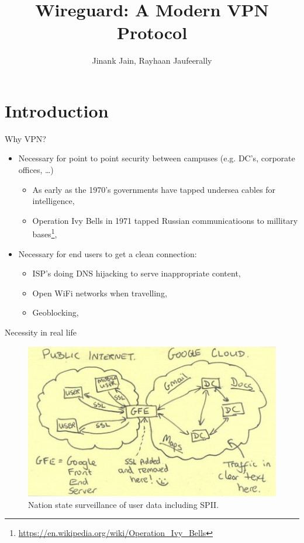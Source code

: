 \documentclass{beamer}
\title{Wireguard: A Modern VPN Protocol}
\author{Jinank Jain, Rayhaan Jaufeerally}
\institute{ETH Z\"urich}
\begin{document}
    \maketitle
    \section{Introduction}
    \begin{frame}{Why VPN?}
        \begin{itemize}
            \item Necessary for point to point security between campuses (e.g. DC's, corporate offices, \ldots)
                \begin{itemize}
                    \item As early as the 1970's governments have tapped undersea cables for intelligence,
                    \item Operation Ivy Bells in 1971 tapped Russian communicatioons to millitary bases\footnote{\url{https://en.wikipedia.org/wiki/Operation\_Ivy\_Bells}},
                \end{itemize}
            \item Necessary for end users to get a clean connection:
                \begin{itemize}
                    \item ISP's doing DNS hijacking to serve inappropriate content,
                    \item Open WiFi networks when travelling,
                    \item Geoblocking,
                \end{itemize}
        \end{itemize}
    \end{frame}
    \begin{frame}{Necessity in real life}
        \begin{figure}
            \includegraphics[width=\textwidth]{motivation.jpg}
            \caption{Nation state surveillance of user data including SPII.}
        \end{figure}
    \end{frame}
\end{document}

